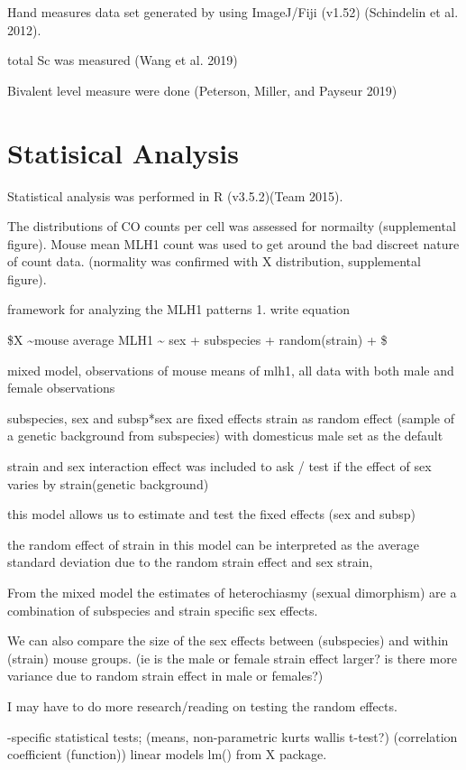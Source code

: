 \documentclass[]{article}
\begin{document}
Hand measures data set generated by using ImageJ/Fiji (v1.52)
(Schindelin et al. 2012).

total Sc was measured (Wang et al. 2019)

Bivalent level measure were done (Peterson, Miller, and Payseur 2019)

\section{Statisical Analysis}\label{statisical-analysis}

Statistical analysis was performed in R (v3.5.2)(Team 2015).

The distributions of CO counts per cell was assessed for normailty
(supplemental figure). Mouse mean MLH1 count was used to get around the
bad discreet nature of count data. (normality was confirmed with X
distribution, supplemental figure).

framework for analyzing the MLH1 patterns 1. write equation

\$X \sim mouse average MLH1 \textasciitilde{} sex + subspecies +
random(strain) + \xi \$

mixed model, observations of mouse means of mlh1, all data with both
male and female observations

subspecies, sex and subsp*sex are fixed effects strain as random effect
(sample of a genetic background from subspecies) with domesticus male
set as the default

strain and sex interaction effect was included to ask / test if the
effect of sex varies by strain(genetic background)

this model allows us to estimate and test the fixed effects (sex and
subsp)

the random effect of strain in this model can be interpreted as the
average standard deviation due to the random strain effect and sex
strain,

From the mixed model the estimates of heterochiasmy (sexual dimorphism)
are a combination of subspecies and strain specific sex effects.

We can also compare the size of the sex effects between (subspecies) and
within (strain) mouse groups. (ie is the male or female strain effect
larger? is there more variance due to random strain effect in male or
females?)

I may have to do more research/reading on testing the random effects.

-specific statistical tests; (means, non-parametric kurts wallis
t-test?) (correlation coefficient (function)) linear models lm() from X
package.
\end{document}
